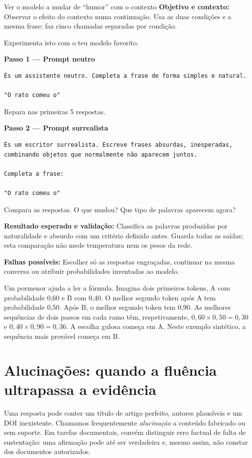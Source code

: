 \begin{promptlabbox}{Ver o modelo a mudar de “humor” com o contexto}
\textbf{Objetivo e contexto:} Observar o efeito do contexto numa continuação. Usa as duas condições e a mesma frase; faz cinco chamadas separadas por condição.

Experimenta isto com o teu modelo favorito.

\medskip

\textbf{Passo 1 — Prompt neutro}

\begin{lstlisting}
És um assistente neutro. Completa a frase de forma simples e natural.

"O rato comeu o"
\end{lstlisting}

Repara nas primeiras 5 respostas.

\medskip

\textbf{Passo 2 — Prompt surrealista}

\begin{lstlisting}
És um escritor surrealista. Escreve frases absurdas, inesperadas,
combinando objetos que normalmente não aparecem juntos.

Completa a frase:

"O rato comeu o"
\end{lstlisting}

Compara as respostas. O que mudou? Que tipo de palavras aparecem agora?

\textbf{Resultado esperado e validação:} Classifica as palavras produzidas por naturalidade e absurdo com um critério definido antes. Guarda todas as saídas; esta comparação não mede temperatura nem os pesos da rede.

\textbf{Falhas possíveis:} Escolher só as respostas engraçadas, continuar na mesma conversa ou atribuir probabilidades inventadas ao modelo.
\end{promptlabbox}

Um pormenor ajuda a ler a fórmula. Imagina dois primeiros tokens, A com probabilidade 0,60 e B com 0,40. O melhor segundo token após A tem probabilidade 0,50. Após B, o melhor segundo token tem 0,90. As melhores sequências de dois passos em cada ramo têm, respetivamente, $0{,}60\times0{,}50=0{,}30$ e $0{,}40\times0{,}90=0{,}36$. A escolha gulosa começa em A. Neste exemplo sintético, a sequência mais provável começa em B.

\section{Alucinações: quando a fluência ultrapassa a evidência}
Uma resposta pode conter um título de artigo perfeito, autores plausíveis e um DOI inexistente. Chamamos frequentemente \emph{alucinação} a conteúdo fabricado ou sem suporte. Em tarefas documentais, convém distinguir erro factual de falta de sustentação: uma afirmação pode até ser verdadeira e, mesmo assim, não constar dos documentos autorizados.

